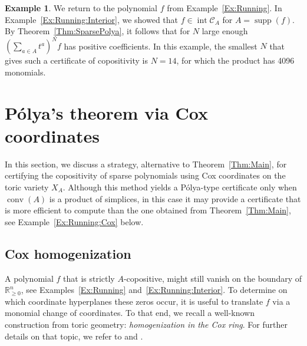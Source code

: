 \documentclass[a4paper,11pt]{amsart}
\theoremstyle{definition}
\newtheorem{example}[theorem]{Example}
\DeclareMathOperator{\interior}{int}
\DeclareMathOperator{\conv}{conv}
\DeclareMathOperator{\supp}{supp}
\begin{document}
\begin{example}
\label{Ex:Running:Sparse}
We return to the polynomial $f$ from Example~\ref{Ex:Running}. In Example~\ref{Ex:Running:Interior}, we showed that $f \in \interior \mathcal{C}_{A}$ for $A = \supp(f)$. By Theorem~\ref{Thm:SparsePolya}, it follows that for $N$ large enough $(\sum_{a \in A}t^a)^Nf$ has positive coefficients. In this example, the smallest $N$ that gives such a certificate of copositivity is $N = 14$, for which the product has 4096 monomials.
\end{example}

\section{Pólya's theorem via Cox coordinates}
\label{sec:Cox}
In this section, we discuss a strategy, alternative to Theorem~\ref{Thm:Main}, for certifying the copositivity of sparse polynomials using Cox coordinates on the toric variety $X_A$. Although this method yields a Pólya-type certificate only when $\conv(A)$ is a product of simplices, in this case it may provide a certificate that is more efficient to compute than the one obtained from Theorem~\ref{Thm:Main}, see Example~\ref{Ex:Running:Cox} below.

\subsection{Cox homogenization}
A polynomial $f$ that is strictly $A$-copositive, might still vanish on the boundary of $\mathbb{R}^n_{\geq0}$, see Examples~\ref{Ex:Running} and~\ref{Ex:Running:Interior}. To determine on which coordinate hyperplanes these zeros occur, it is useful to translate $f$ via a monomial change of coordinates. To that end, we recall a well-known construction from toric geometry: \emph{homogenization in the Cox ring}. For further details on that topic, we refer to \cite[Section 6]{telen2022introductiontoricgeometry} and \cite[Chapter 5]{CoxLittleSchenck}.
\end{document}
